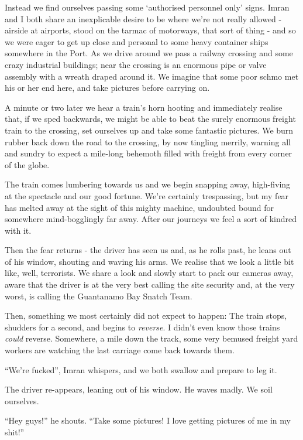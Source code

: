 \documentclass[a5paper,titlepage,11pt,draft]{book}
\begin{document}
Instead we find ourselves passing some `authorised personnel only' signs.  Imran and I both share an inexplicable desire to be where we're not really allowed - airside at airports, stood on the tarmac of motorways, that sort of thing - and so we were eager to get up close and personal to some heavy container ships somewhere in the Port.  As we drive around we pass a railway crossing and some crazy industrial buildings; near the crossing is an enormous pipe or valve assembly with a wreath draped around it.  We imagine that some poor schmo met his or her end here, and take pictures before carrying on.

A minute or two later we hear a train's horn hooting and immediately realise that, if we sped backwards, we might be able to beat the surely enormous freight train to the crossing, set ourselves up and take some fantastic pictures.  We burn rubber back down the road to the crossing, by now tingling merrily, warning all and sundry to expect a mile-long behemoth filled with freight from every corner of the globe.

The train comes lumbering towards us and we begin snapping away, high-fiving at the spectacle and our good fortune.  We're certainly trespassing, but my fear has melted away at the sight of this mighty machine, undoubted bound for somewhere mind-bogglingly far away.  After our journeys we feel a sort of kindred with it.

Then the fear returns - the driver has seen us and, as he rolls past, he leans out of his window, shouting and waving his arms.  We realise that we look a little bit like, well, terrorists.  We share a look and slowly start to pack our cameras away, aware that the driver is at the very best calling the site security and, at the very worst, is calling the Guantanamo Bay Snatch Team.

Then, something we most certainly did not expect to happen:  The train stops, shudders for a second, and begins to \emph{reverse}.  I didn't even know those trains \emph{could} reverse.  Somewhere, a mile down the track, some very bemused freight yard workers are watching the last carriage come back towards them.

``We're fucked'', Imran whispers, and we both swallow and prepare to leg it.

The driver re-appears, leaning out of his window.  He waves madly.  We soil ourselves.

``Hey guys!'' he shouts.  ``Take some pictures!  I love getting pictures of me in my shit!''
\end{document}
